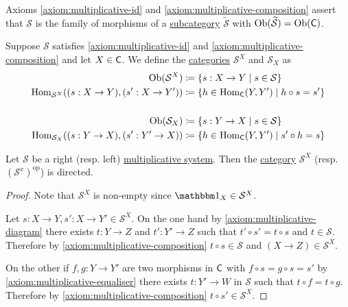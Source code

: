 \documentclass[../../main]{subfiles}
\begin{document}
\begin{remark}
  Axioms \ref{axiom:multiplicative-id} and \ref{axiom:multiplicative-composition} assert that \(\mathcal{S}\) is the family of morphisms of a \hyperref[def:subcategory]{subcategory} \(\widetilde{\mathcal{S}}\) with \(\operatorname{Ob}(\widetilde{\mathcal{S}}) = \operatorname{Ob}(\mathsf{C})\).
\end{remark}

\begin{definition}
  Suppose \(\mathcal{S}\) satisfies \ref{axiom:multiplicative-id} and \ref{axiom:multiplicative-composition} and let \(X \in \mathsf{C}\).
  We define the \hyperref[def:category]{categories} \(\mathcal{S}^{X}\) and \(\mathcal{S}_{X}\) as
  \begin{align*}
    \operatorname{Ob}(\mathcal{S}^{X}) &\coloneq \{s: X \to Y \mid s \in \mathcal{S}\}  \\
    \operatorname{Hom}_{\mathcal{S}^{X}}( (s: X \to Y), (s': X \to Y') ) &\coloneq \{ h \in \operatorname{Hom}_{\mathsf{C}}(Y, Y') \mid h \circ s = s'\}  \\ \\
    \operatorname{Ob}(\mathcal{S}_{X}) &\coloneq \{s: Y \to X \mid s \in \mathcal{S}\} \\
    \operatorname{Hom}_{\mathcal{S}_{X}}( (s: Y \to X), (s': Y' \to X) ) &\coloneq \{ h \in \operatorname{Hom}_{\mathsf{C}}(Y, Y') \mid s ' \circ h = s \}
  \end{align*}
\end{definition}

\begin{proposition}
  Let \(\mathcal{S}\) be a right (resp. left) \hyperref[def:multiplicative-system]{multiplicative system}.
  Then the \hyperref[def:category]{category} \(\mathcal{S}^{X}\) (resp. \((\mathcal{S}^{x})^{\operatorname{op}}\)) is directed.
\end{proposition}
\begin{proof}
  Note that \(\mathcal{S}^{X}\) is non-empty since \(\id_{X} \in \mathcal{S}^{X}\).

  Let \(s: X \to Y, s': X \to Y' \in \mathcal{S}^{X}\).
  On the one hand by \ref{axiom:multiplicative-diagram} there exists \(t: Y \to Z\) and \(t': Y' \to Z\) such that \(t' \circ s' = t \circ s\) and \(t \in \mathcal{S}\).
  Therefore by \ref{axiom:multiplicative-composition} \(t \circ s \in \mathcal{S}\) and \((X \to Z) \in \mathcal{S}^{X}\).

  On the other if \(f, g: Y \to Y'\) are two morphisms in \(\mathsf{C}\) with \(f \circ s = g \circ s = s'\) by \ref{axiom:multiplicative-equaliser} there exists \(t: Y' \to W\) in \(\mathcal{S}\) such that \(t \circ f = t \circ g\).
  Therefore by \ref{axiom:multiplicative-composition} \(t \circ s' \in \mathcal{S}^{X}\).
\end{proof}
\end{document}
